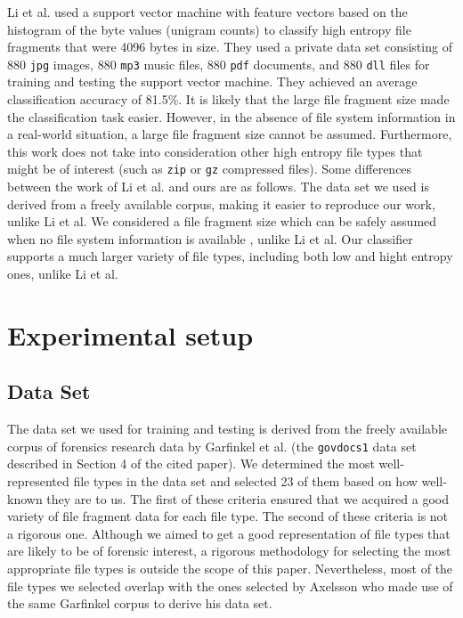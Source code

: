 \documentclass[letter,11pt]{article}
\begin{document}
Li et al. \cite{Li10} used a support vector machine with feature vectors based on the histogram of the byte values (unigram counts) to classify high entropy file fragments that were 4096 bytes in size. They used a private data set consisting of 880 \texttt{jpg} images, 880 \texttt{mp3} music files, 880 \texttt{pdf} documents, and 880 \texttt{dll} files for training and testing the support vector machine. They achieved an average classification accuracy of 81.5\%. It is likely that the large file fragment size made the classification task easier. However, in the absence of file system information in a real-world situation, a large file fragment size cannot be assumed. Furthermore, this work does not take into consideration other high entropy file types that might be of interest (such as \texttt{zip} or \texttt{gz} compressed files). Some differences between the work of Li et al. and ours are as follows. The data set we used is derived from a freely available corpus, making it easier to reproduce our work, unlike Li et al. We considered a file fragment size which can be safely assumed when no file system information is available \cite{Axelsson10}, unlike Li et al. Our classifier supports a much larger variety of file types, including both low and hight entropy ones, unlike Li et al.

\section{Experimental setup}
\label{Section:ExperimentalSetup}

\subsection{Data Set}
\label{Subsection:DataSet}

The data set we used for training and testing is derived from the freely available corpus of forensics research data by Garfinkel et al. \cite{Garfinkel09} (the \texttt{govdocs1} data set described in Section 4 of the cited paper). We determined the most well-represented file types in the data set and selected 23 of them based on how well-known they are to us. The first of these criteria ensured that we acquired a good variety of file fragment data for each file type. The second of these criteria is not a rigorous one. Although we aimed to get a good representation of file types that are likely to be of forensic interest, a rigorous methodology for selecting the most appropriate file types is outside the scope of this paper. Nevertheless, most of the file types we selected overlap with the ones selected by Axelsson \cite{Axelsson10} who made use of the same Garfinkel corpus to derive his data set.
\end{document}
